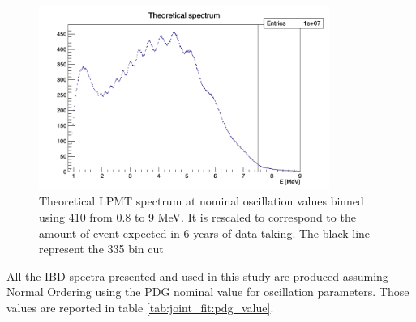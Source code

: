 \documentclass[../main.tex]{subfiles}
\begin{document}
\begin{figure}
  \centering
  \includegraphics[height=6cm]{images/joint_fit/theoretical_spectrum.png}
  \caption{Theoretical LPMT spectrum at nominal oscillation values binned using 410 from 0.8 to 9 MeV. It is rescaled to correspond to the amount of event expected in 6 years of data taking. The black line represent the 335 bin cut}
  \label{fig:joint_fit:delta:theo}
\end{figure}

All the IBD spectra presented and used in this study are produced assuming Normal Ordering using the PDG nominal value \cite{particle_data_group_review_2020} for oscillation parameters. Those values are reported in table \ref{tab:joint_fit:pdg_value}.

%
%
%
%
\end{document}
